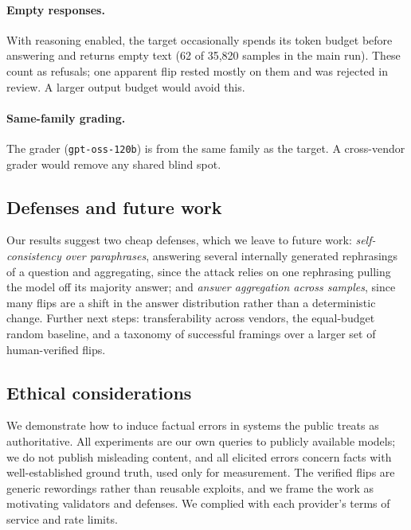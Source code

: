 \documentclass[sigconf,nonacm]{acmart}
\begin{document}
\paragraph{Empty responses.} With reasoning enabled, the target occasionally spends its token budget before answering and returns empty text (62 of 35{,}820 samples in the main run). These count as refusals; one apparent flip rested mostly on them and was rejected in review. A larger output budget would avoid this.

\paragraph{Same-family grading.} The grader (\texttt{gpt-oss-120b}) is from the same family as the target. A cross-vendor grader would remove any shared blind spot.

\subsection{Defenses and future work}
Our results suggest two cheap defenses, which we leave to future work: \emph{self-consistency over paraphrases}, answering several internally generated rephrasings of a question and aggregating, since the attack relies on one rephrasing pulling the model off its majority answer; and \emph{answer aggregation across samples}, since many flips are a shift in the answer distribution rather than a deterministic change. Further next steps: transferability across vendors, the equal-budget random baseline, and a taxonomy of successful framings over a larger set of human-verified flips.

\subsection{Ethical considerations}
We demonstrate how to induce factual errors in systems the public treats as authoritative. All experiments are our own queries to publicly available models; we do not publish misleading content, and all elicited errors concern facts with well-established ground truth, used only for measurement. The verified flips are generic rewordings rather than reusable exploits, and we frame the work as motivating validators and defenses. We complied with each provider's terms of service and rate limits.

\end{document}
